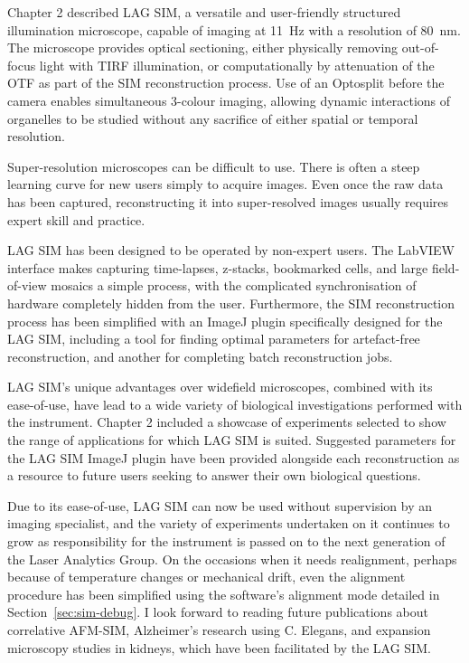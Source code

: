 Chapter 2 described LAG SIM, a versatile and user-friendly structured illumination microscope, capable of imaging at \SI{11}{\hertz} with a resolution of \SI{80}{\nano\metre}. 
The microscope provides optical sectioning, either physically removing out-of-focus light with TIRF illumination, or computationally by attenuation of the OTF as part of the SIM reconstruction process. 
Use of an Optosplit before the camera enables simultaneous 3-colour imaging, allowing dynamic interactions of organelles to be studied without any sacrifice of either spatial or temporal resolution.

Super-resolution microscopes can be difficult to use.
There is often a steep learning curve for new users simply to acquire images. 
Even once the raw data has been captured, reconstructing it into super-resolved images usually requires expert skill and practice. 

LAG SIM has been designed to be operated by non-expert users. 
The LabVIEW interface makes capturing time-lapses, z-stacks, bookmarked cells, and large field-of-view mosaics a simple process, with the complicated synchronisation of hardware completely hidden from the user. 
Furthermore, the SIM reconstruction process has been simplified with an ImageJ plugin specifically designed for the LAG SIM, including a tool for finding optimal parameters for artefact-free reconstruction, and another for completing batch reconstruction jobs. 

LAG SIM's unique advantages over widefield microscopes, combined with its ease-of-use, have lead to a wide variety of biological investigations performed with the instrument. 
Chapter 2 included a showcase of experiments selected to show the range of applications for which LAG SIM is suited. 
Suggested parameters for the LAG SIM ImageJ plugin have been provided alongside each reconstruction as a resource to future users seeking to answer their own biological questions. 

Due to its ease-of-use, LAG SIM can now be used without supervision by an imaging specialist, and the variety of experiments undertaken on it continues to grow as responsibility for the instrument is passed on to the next generation of the Laser Analytics Group. 
On the occasions when it needs realignment, perhaps because of temperature changes or mechanical drift, even the alignment procedure has been simplified using the software's alignment mode detailed in Section~\ref{sec:sim-debug}. 
I look forward to reading future publications about correlative AFM-SIM, Alzheimer's research using C. Elegans, and expansion microscopy studies in kidneys, which have been facilitated by the LAG SIM. 

